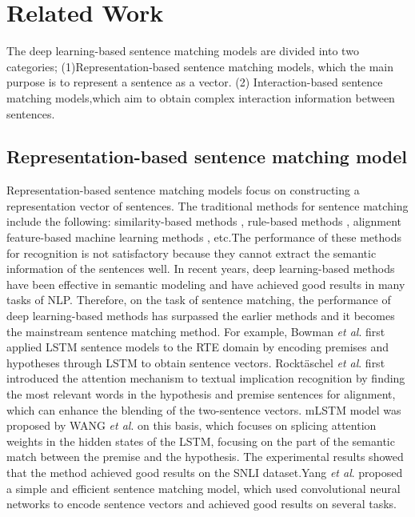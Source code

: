 \documentclass[review]{elsarticle}
\begin{document}
\section{Related Work}

The  deep learning-based sentence matching models are divided into two categories; (1)Representation-based sentence matching models, which the  main purpose is to represent a sentence as a vector. (2) Interaction-based sentence matching models,which aim to obtain complex interaction information between sentences.

\subsection{Representation-based sentence matching model}

Representation-based sentence matching models focus on constructing a representation vector of sentences. The traditional methods for sentence matching include the following: similarity-based methods \cite{renhan2015recognizing}, rule-based methods \cite{hu2020extended}, alignment feature-based machine learning methods \cite{sultan2015feature}, etc.The performance of these methods for recognition is not satisfactory because they cannot extract the semantic information of the sentences well. In recent years, deep learning-based methods have been effective in semantic modeling and have achieved good results in many tasks of NLP. Therefore, on the task of sentence matching, the performance of deep learning-based methods has surpassed the earlier methods and it becomes the mainstream sentence matching method. For example, Bowman {\it et al}.\cite{bowman2015large}  first applied LSTM sentence models to the RTE domain by encoding premises and hypotheses through LSTM to obtain sentence vectors. Rocktäschel {\it et al}.\cite{rocktaschel2015reasoning} first introduced the attention mechanism to textual implication recognition by finding the most relevant words in the hypothesis and premise sentences for alignment, which can enhance the blending of the two-sentence vectors. mLSTM model was proposed by WANG {\it et al}.\cite{wang2016learning} on this basis, which focuses on splicing attention weights in the hidden states of the LSTM, focusing on the part of the semantic match between the premise and the hypothesis. The experimental results showed that the method achieved good results on the SNLI dataset.Yang {\it et al}.\cite{yang2019simple} proposed a simple and efficient sentence matching model, which used convolutional neural networks to encode sentence vectors and achieved good results on several tasks.
\end{document}

